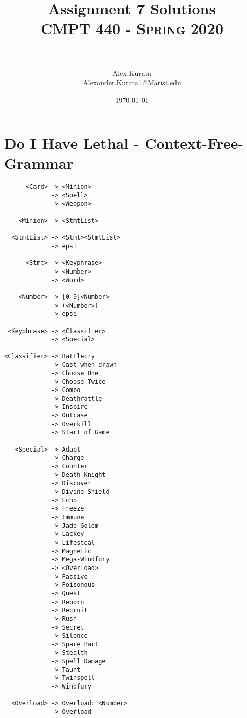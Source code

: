 \documentclass{article}
\title{
   \huge Assignment 7 Solutions  \\     	    %
   \normalfont \normalsize
   \textsc{CMPT 440 - Spring 2020} \\[10pt] %
   \horrule{0.5pt} \\[0.25cm] 	%
}
\author{Alex Kurata \\ \normalsize Alexander.Kurata1@Marist.edu}
\date{\normalsize\today} 	%
\numberwithin{equation}{section} %
\numberwithin{figure}{section} %
\numberwithin{table}{section} %
\begin{document}
\section{Do I Have Lethal - Context-Free-Grammar}
\begin{lstlisting}
      <Card> -> <Minion>
             -> <Spell>
             -> <Weapon>

    <Minion> -> <StmtList>

  <StmtList> -> <Stmt><StmtList>
             -> epsi

      <Stmt> -> <Keyphrase>
             -> <Number>
             -> <Word>

    <Number> -> [0-9]<Number>
             -> (<Number>)
             -> epsi

 <Keyphrase> -> <Classifier>
             -> <Special>

<Classifier> -> Battlecry
             -> Cast when drawn
             -> Choose One
             -> Choose Twice
             -> Combo
             -> Deathrattle
             -> Inspire
             -> Outcase
             -> Overkill
             -> Start of Game

   <Special> -> Adapt
             -> Charge
             -> Counter
             -> Death Knight
             -> Discover
             -> Divine Shield
             -> Echo
             -> Freeze
             -> Immune
             -> Jade Golem
             -> Lackey
             -> Lifesteal
             -> Magnetic
             -> Mega-Windfury
             -> <Overload>
             -> Passive
             -> Poisonous
             -> Quest
             -> Reborn
             -> Recruit
             -> Rush
             -> Secret
             -> Silence
             -> Spare Part
             -> Stealth
             -> Spell Damage
             -> Taunt
             -> Twinspell
             -> Windfury

  <Overload> -> Overload: <Number>
             -> Overload
\end{lstlisting}
\end{document}
